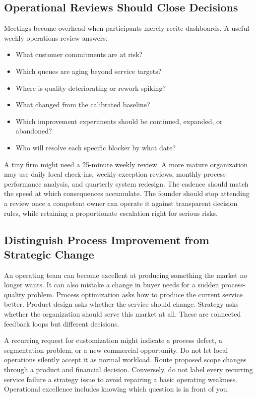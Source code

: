 \subsection{Operational Reviews Should Close Decisions}
\label{sec:operational_reviews}

Meetings become overhead when participants merely recite dashboards. A useful weekly operations review answers:
\begin{itemize}
    \item What customer commitments are at risk?
    \item Which queues are aging beyond service targets?
    \item Where is quality deteriorating or rework spiking?
    \item What changed from the calibrated baseline?
    \item Which improvement experiments should be continued, expanded, or abandoned?
    \item Who will resolve each specific blocker by what date?
\end{itemize}

A tiny firm might need a 25-minute weekly review. A more mature organization may use daily local check-ins, weekly exception reviews, monthly process-performance analysis, and quarterly system redesign. The cadence should match the speed at which consequences accumulate. The founder should stop attending a review once a competent owner can operate it against transparent decision rules, while retaining a proportionate escalation right for serious risks.

\subsection{Distinguish Process Improvement from Strategic Change}
\label{sec:process_vs_strategy}

An operating team can become excellent at producing something the market no longer wants. It can also mistake a change in buyer needs for a sudden process-quality problem. Process optimization asks how to produce the current service better. Product design asks whether the service should change. Strategy asks whether the organization should serve this market at all. These are connected feedback loops but different decisions.

A recurring request for customization might indicate a process defect, a segmentation problem, or a new commercial opportunity. Do not let local operations silently accept it as normal workload. Route proposed scope changes through a product and financial decision. Conversely, do not label every recurring service failure a strategy issue to avoid repairing a basic operating weakness. Operational excellence includes knowing which question is in front of you.
